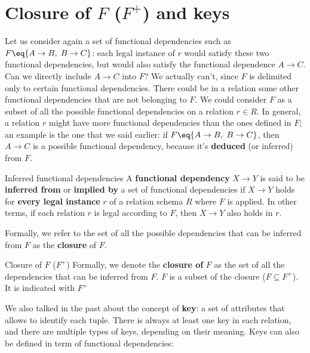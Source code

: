 \section{Closure of $F$ ($F^+$) and keys}

Let us consider again a set of functional dependencies such as $F \eq \{ A \rightarrow B, \; B \rightarrow C \}$: each legal instance of $r$ would satisfy these two functional dependencies, but would also satisfy the functional dependence $A \rightarrow C$. Can we directly include $A \rightarrow C$ into $F$? We actually can't, since $F$ is delimited only to certain functional dependencies. There could be in a relation some other functional dependencies that are not belonging to $F$. We could consider $F$ as a subset of all the possible functional dependencies on a relation $r \in R$.
\nwl
In general, a relation $r$ might have more functional dependencies than the ones defined in $F$; an example is the one that we said earlier: if $F \eq \{ A \rightarrow B, \; B \rightarrow C \}$, then $A \rightarrow C$ is a possible functional dependency, because it's \textbf{deduced} (or inferred) from $F$.

\begin{definition}{Inferred functional dependencies}
    A \textbf{functional dependency} $X \rightarrow Y$ is said to be \textbf{inferred from} or \textbf{implied by} a set of functional dependencies if $X \rightarrow Y$ holds for \textbf{every legal instance} $r$ of a relation schema $R$ where $F$ is applied.
    \nwl
    In other terms, if each relation $r$ is legal according to $F$, then $X \rightarrow Y$ also holds in $r$.
\end{definition}

Formally, we refer to the set of all the possible dependencies that can be inferred from $F$ as the \textbf{closure} of $F$.

\begin{definition}{Closure of $F$ ($F^+$)}
    Formally, we denote the \textbf{closure of} $F$ as the set of all the dependencies that can be inferred from $F$. $F$ is a subset of the closure ($F \subseteq F^+$). It is indicated with $F^+$
\end{definition}

We also talked in the past about the concept of \textbf{key}: a set of attributes that allows to identify each tuple. There is always at least one key in each relation, and there are multiple types of keys, depending on their meaning. Keys can also be defined in term of functional dependencies:

